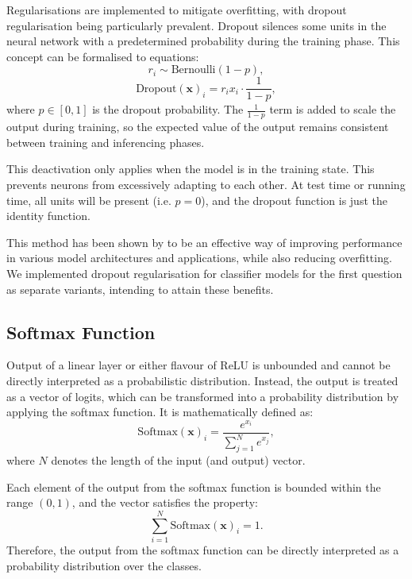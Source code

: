 \documentclass{l4proj}
\begin{document}
Regularisations are implemented to mitigate overfitting,  with dropout regularisation being particularly prevalent. Dropout silences some units in the neural network with a predetermined probability during the training phase. This concept can be formalised to equations:
\begin{equation}
    r_i \sim \text{Bernoulli}(1-p),
\end{equation}
\begin{equation}
    \text{Dropout}(\boldsymbol{x})_i = r_ix_i \cdot \frac{1}{1-p},
\end{equation}
where $p \in [0,1]$ is the dropout probability. The $\frac{1}{1-p}$ term is added to scale the output during training, so the expected value of the output remains consistent between training and inferencing phases. 

This deactivation only applies when the model is in the training state. This prevents neurons from excessively adapting to each other. At test time or running time, all units will be present (i.e. $p = 0$), and the dropout function is just the identity function. 

This method has been shown by \cite{srivastava2014} to be an effective way of improving performance in various model architectures and applications, while also reducing overfitting. We implemented dropout regularisation for classifier models for the first question as separate variants, intending to attain these benefits.

\subsection{Softmax Function}
Output of a linear layer or either flavour of ReLU is unbounded and cannot be directly interpreted as a probabilistic distribution. Instead, the output is treated as a vector of logits, which can be transformed into a probability distribution by applying the softmax function. It is mathematically defined as:
\begin{equation}
    \text{Softmax}(\boldsymbol{x})_i = \frac{e^{x_i}}{\sum\limits^{N}_{j=1}e^{x_j}},
\end{equation}
where $N$ denotes the length of the input (and output) vector.

Each element of the output from the softmax function is bounded within the range $(0, 1)$, and the vector satisfies the property:
\begin{equation}
    \sum\limits_{i=1}^N \text{Softmax}(\boldsymbol{x})_i = 1.
\end{equation} 
Therefore, the output from the softmax function can be directly interpreted as a probability distribution over the classes.
\end{document}
